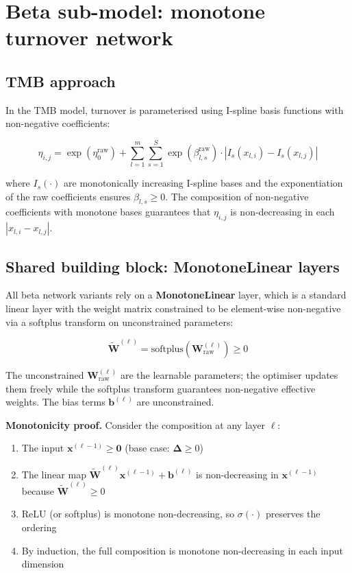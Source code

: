 \documentclass{article}
\begin{document}
\section{Beta sub-model: monotone turnover network}

\subsection{TMB approach}

In the TMB model, turnover is parameterised using I-spline basis functions with non-negative coefficients:

\begin{equation*}
    \eta_{i,j} = \exp(\eta_0^{\text{raw}}) + \sum_{l=1}^{m}\sum_{s=1}^{S} \exp(\beta_{l,s}^{\text{raw}}) \cdot \left|I_s(x_{l,i}) - I_s(x_{l,j})\right|
\end{equation*}

where $I_s(\cdot)$ are monotonically increasing I-spline bases and the exponentiation of the raw coefficients ensures $\beta_{l,s} \geq 0$. The composition of non-negative coefficients with monotone bases guarantees that $\eta_{i,j}$ is non-decreasing in each $|x_{l,i} - x_{l,j}|$.

\subsection{Shared building block: MonotoneLinear layers}

All beta network variants rely on a \textbf{MonotoneLinear} layer, which is a standard linear layer with the weight matrix constrained to be element-wise non-negative via a softplus transform on unconstrained parameters:

\begin{equation}
    \tilde{\mathbf{W}}^{(\ell)} = \text{softplus}(\mathbf{W}^{(\ell)}_{\text{raw}}) \geq 0
\end{equation}

The unconstrained $\mathbf{W}^{(\ell)}_{\text{raw}}$ are the learnable parameters; the optimiser updates them freely while the softplus transform guarantees non-negative effective weights. The bias terms $\mathbf{b}^{(\ell)}$ are unconstrained.

\textbf{Monotonicity proof.} Consider the composition at any layer $\ell$:
\begin{enumerate}
    \item The input $\mathbf{x}^{(\ell-1)} \geq \mathbf{0}$ (base case: $\bm{\Delta} \geq 0$)
    \item The linear map $\tilde{\mathbf{W}}^{(\ell)}\mathbf{x}^{(\ell-1)} + \mathbf{b}^{(\ell)}$ is non-decreasing in $\mathbf{x}^{(\ell-1)}$ because $\tilde{\mathbf{W}}^{(\ell)} \geq 0$
    \item ReLU (or softplus) is monotone non-decreasing, so $\sigma(\cdot)$ preserves the ordering
    \item By induction, the full composition is monotone non-decreasing in each input dimension
\end{enumerate}
\end{document}
